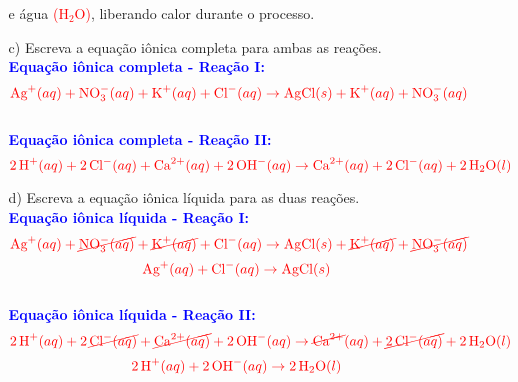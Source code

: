 \documentclass[a4paper, 12pt]{article}
\begin{document}
\begin{enumerate}
\begin{enumerate}[align=left, labelsep=-0.5em]
{                        e água \textcolor{red}{($\text{H}_{2}\text{O}$)}, liberando calor durante
                        o processo.}
              \item[c)] Escreva a equação iônica completa para ambas as reações.
                    \\[10pt] \textcolor{blue}{\textbf{Equação iônica completa - Reação I:}}
                    \[
                        \textcolor{red}{\text{Ag}^+ (aq) + \text{NO}_3^- (aq) + \text{K}^+ (aq)
                            + \text{Cl}^- (aq) \rightarrow \text{AgCl} (s) + \text{K}^+ (aq) +
                            \text{NO}_3^- (aq)}
                    \]
                    \\[10pt] \textcolor{blue}{\textbf{Equação iônica completa - Reação II:}}
                    \[
                        \textcolor{red}{2 \, \text{H}^+ (aq) + 2 \, \text{Cl}^- (aq) +
                            \text{Ca}^{2+} (aq) + 2 \, \text{OH}^- (aq) \rightarrow \text{Ca}^{2+}
                            (aq) + 2 \, \text{Cl}^- (aq) + 2 \, \text{H}_2\text{O} (l)}
                    \]
              \item[d)] Escreva a equação iônica líquida para as duas reações.
                    \\[10pt]
                    \textcolor{blue}{\textbf{Equação iônica líquida - Reação I:}}
                    \[
                        \textcolor{red}{\text{Ag}^+ (aq) + \cancel{\text{NO}_3^- (aq)} + \cancel{\text{K}^+ (aq)}
                            + \text{Cl}^- (aq) \rightarrow \text{AgCl} (s) + \cancel{\text{K}^+ (aq)} +
                            \cancel{\text{NO}_3^- (aq)}}
                    \]
                    \[
                        \textcolor{red}{\text{Ag}^+ (aq) + \text{Cl}^- (aq) \rightarrow
                            \text{AgCl} (s)}
                    \]
                    \\[10pt]
                    \textcolor{blue}{\textbf{Equação iônica líquida - Reação II:}}
                    \[
                        \textcolor{red}{2 \, \text{H}^+ (aq) + 2 \, \cancel{\text{Cl}^- (aq)} + \cancel{\text{Ca}^{2+} (aq)} + 2 \, \text{OH}^- (aq) \rightarrow \cancel{\text{Ca}^{2+}} (aq) + \cancel{2 \, \text{Cl}^- (aq)} + 2 \, \text{H}_2\text{O} (l)}
                    \]
                    \[
                        \textcolor{red}{2 \, \text{H}^+ (aq) + 2 \, \text{OH}^- (aq)
                            \rightarrow 2 \, \text{H}_2\text{O} (l)}
                    \]
          \end{enumerate}


\end{enumerate}
\end{document}
